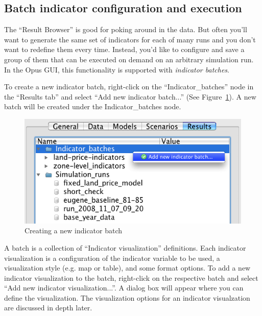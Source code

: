 \subsection{Batch indicator configuration and execution}
\label{sec:batch-indicator-configuration}

The ``Result Browser'' is good for poking around in the
data. But often you'll want to generate the same
set of indicators for each of many runs and you don't want to
redefine them every time. Instead, you'd like to configure and save a
group of them that can be executed on demand on an arbitrary
simulation run. In the Opus GUI, this functionality is supported with
\emph{indicator batches}. 

To create a new indicator batch, right-click on the
 ``Indicator\_batches'' node in the ``Results tab'' and select
 ``Add new indicator batch...'' (See
Figure~\ref{fig:results-manager-new-batch}). A new batch will be
created under the Indicator\_batches node.

\begin{figure}[htp]
\begin{center}
\includegraphics[width=.6\textwidth]{part-gui/images/result-manager-add-new-batch.png}
\end{center}
\caption{Creating a new indicator batch}
\label{fig:results-manager-new-batch}
\end{figure}

A batch is a collection of ``Indicator visualization''
definitions. Each indicator visualization is a configuration of
the indicator variable to be used, a visualization style (e.g. map or
table), and some format options. To add a new indicator visualization
to the batch, right-click on the respective batch and select
``Add new indicator visualization...''. A dialog box will
appear where you can define the visualization. The visualization
options for an indicator visualzation are discussed in depth later.

